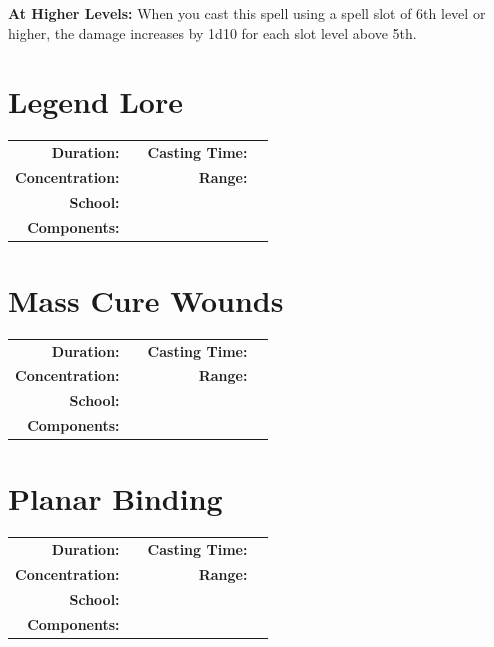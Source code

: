 \documentclass[12pt,showtrims]{memoir}
\begin{document}
\vspace{8pt} \noindent\textbf{At Higher Levels:} When you cast this spell using a spell slot of 6th level or higher, the damage increases by 1d10 for each slot level above 5th.
\newpage
\section*{Legend Lore}
{
\small\centering\vspace{-6pt}
\begin{tabular}{rlrl}
\toprule

\textbf{Duration:} &  &
\textbf{Casting Time:} &  \\
\textbf{Concentration:} & &
\textbf{Range:} &  \\
\textbf{School:} &  \\
\textbf{Components:} & \multicolumn{3}{p{0.7\textwidth}}{}\\

\bottomrule
\end{tabular}
}
\newpage
\section*{Mass Cure Wounds}
{
\small\centering\vspace{-6pt}
\begin{tabular}{rlrl}
\toprule

\textbf{Duration:} &  &
\textbf{Casting Time:} &  \\
\textbf{Concentration:} & &
\textbf{Range:} &  \\
\textbf{School:} &  \\
\textbf{Components:} & \multicolumn{3}{p{0.7\textwidth}}{}\\

\bottomrule
\end{tabular}
}
\newpage
\section*{Planar Binding}
{
\small\centering\vspace{-6pt}
\begin{tabular}{rlrl}
\toprule

\textbf{Duration:} &  &
\textbf{Casting Time:} &  \\
\textbf{Concentration:} & &
\textbf{Range:} &  \\
\textbf{School:} &  \\
\textbf{Components:} & \multicolumn{3}{p{0.7\textwidth}}{}\\

\bottomrule
\end{tabular}
}
\newpage
{}
\newpage
\end{document}
